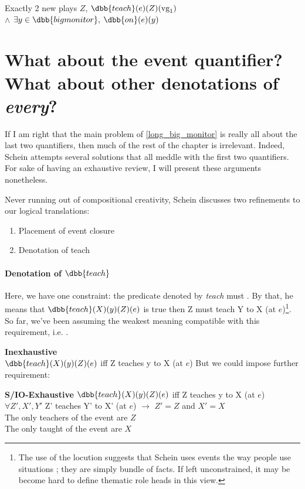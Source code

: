 \documentclass[english]{article}
\begin{document}
\ex
\textsf{Exactly 2 new plays} $Z$, $\dbb{teach}(e)(Z)(\text{vg}_{1})$\\
$\wedge$ $\exists y\in\dbb{big monitor},$ $\dbb{on}(e)(y)$
\xe
%

\section{What about the event quantifier? What about other denotations of \emph{every}?}
If I am right that the main problem of \cref{long_big_monitor} is really all about the last two quantifiers, then much of the rest of the chapter is irrelevant. Indeed, Schein attempts several solutions that all meddle with the first two quantifiers. For sake of having an exhaustive review, I will present these arguments nonetheless.


Never running out of compositional creativity, Schein discusses two refinements to our logical translations:

\begin{enumerate}
\item 
Placement of event closure

\item 
Denotation of teach
\end{enumerate}

\paragraph{Denotation of $\dbb{teach}$} Here, we have one constraint: the predicate denoted by \emph{teach} must . By that, he means that $\dbb{teach}(X)(y)(Z)(e)$ is true then Z must teach Y to X (at $e$)\footnote{The use of the locution  suggests that Schein uses events the way people use situations ; they are simply bundle of facts. If left unconstrained, it may be become hard to define thematic role heads in this view.}. So far, we've been assuming the weakest meaning  compatible with this requirement, i.e. \cnextx. 


\ex
 \textbf{Inexhaustive}\\
$\dbb{teach}(X)(y)(Z)(e)$ iff Z teaches y to X (at $e$)
\xe
%
But we could impose further requirement:

\pex \textbf{S/IO-Exhaustive}
\a 
$\dbb{teach}(X)(y)(Z)(e)$ iff Z teaches y to X (at $e$)\\
$\forall Z', X', Y'$ Z' teaches Y' to X' (at $e$) $\rightarrow$ $Z'=Z$ and $X'=X$\\
\a 
The only teachers of the event are $Z$\\
The only taught of the event are $X$
\xe
%
\end{document}
